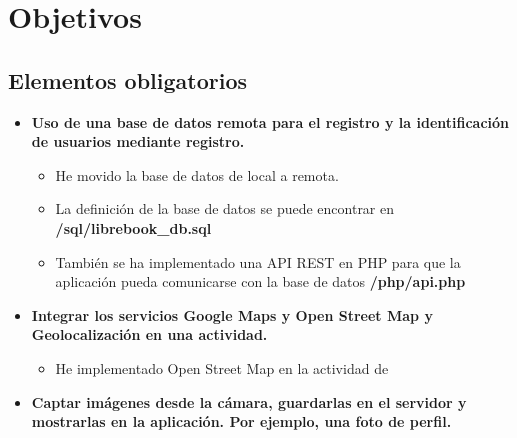 \documentclass[a4paper,12pt]{report}
\begin{document}
  \chapter{Objetivos}
    \section{Elementos obligatorios}
      \begin{itemize}
        \item \textbf{Uso de una base de datos remota para el registro y la identificación de usuarios mediante registro.}
        \begin{itemize}
          \item He movido la base de datos de local a remota.
          \item La definición de la base de datos se puede encontrar en \textbf{/sql/librebook\_db.sql}
          \item También se ha implementado una API REST en PHP para que la aplicación pueda comunicarse con la base de datos \textbf{/php/api.php}
        \end{itemize} 
        \item \textbf{Integrar los servicios Google Maps y Open Street Map y Geolocalización en una actividad.}
        \begin{itemize}
          \item He implementado Open Street Map en la actividad de \textbf{}
        \end{itemize} 
        \item \textbf{Captar imágenes desde la cámara, guardarlas en el servidor y mostrarlas en la aplicación. Por ejemplo, una foto de perfil.}
      \end{itemize}
\end{document}
